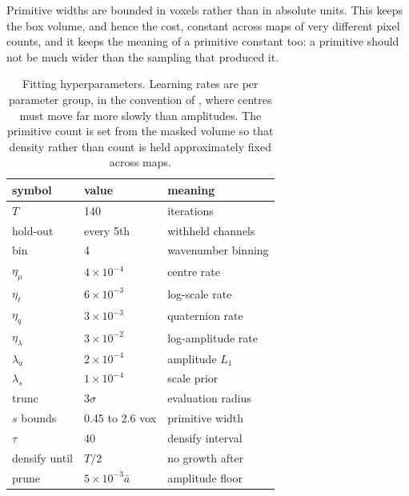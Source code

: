 Primitive widths are bounded in voxels rather than in absolute units. This
keeps the box volume, and hence the cost, constant across maps of very
different pixel counts, and it keeps the meaning of a primitive constant too:
a primitive should not be much wider than the sampling that produced it.

\begin{table}[t]\centering\small
\caption{Fitting hyperparameters. Learning rates are per parameter group, in
the convention of \cite{kerbl20233dgs}, where centres must move far more slowly
than amplitudes. The primitive count is set from the masked volume so that
density rather than count is held approximately fixed across maps.}
\label{tab:hyper}
\begin{tabular}{@{}lll@{}}
\toprule
symbol & value & meaning \\
\midrule
$T$              & 140              & iterations \\
hold-out         & every 5th        & withheld channels \\
bin              & 4                & wavenumber binning \\
$\eta_\mu$       & $4\times10^{-4}$ & centre rate \\
$\eta_\ell$      & $6\times10^{-3}$ & log-scale rate \\
$\eta_q$         & $3\times10^{-3}$ & quaternion rate \\
$\eta_\lambda$   & $3\times10^{-2}$ & log-amplitude rate \\
$\lambda_a$      & $2\times10^{-4}$ & amplitude $L_1$ \\
$\lambda_s$      & $1\times10^{-4}$ & scale prior \\
trunc            & $3\sigma$        & evaluation radius \\
$s$ bounds       & 0.45 to 2.6 vox  & primitive width \\
$\tau$           & 40               & densify interval \\
densify until    & $T/2$            & no growth after \\
prune            & $5\times10^{-3}\bar a$ & amplitude floor \\
\bottomrule
\end{tabular}
\end{table}

